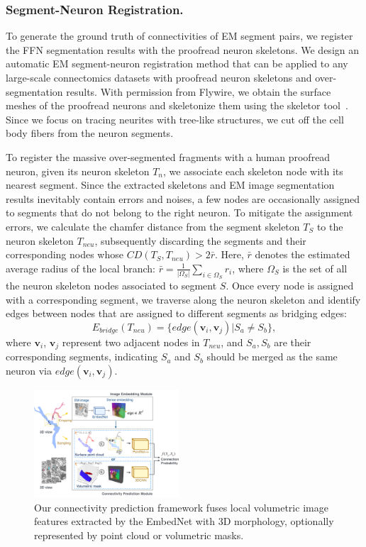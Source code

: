  \subsubsection{Segment-Neuron Registration.} 
 To generate the ground truth of connectivities of EM segment pairs, we register the FFN segmentation results with the proofread neuron skeletons.
 We design an automatic EM segment-neuron registration method that can be applied to any large-scale connectomics datasets with proofread neuron skeletons and over-segmentation results. 
 With permission from Flywire, we obtain the surface meshes of the proofread neurons and skeletonize them using the skeletor tool~\cite{philipp_schlegel_2022_7308283}. 
 Since we focus on tracing neurites with tree-like structures, we cut off the cell body fibers from the neuron segments.

 
To register the massive over-segmented fragments with a human proofread neuron, given its neuron skeleton $T_{n}$, we associate each skeleton node with its nearest segment.
Since the extracted skeletons and EM image segmentation results inevitably contain errors and noises, a few nodes are occasionally assigned to segments that do not belong to the right neuron. 
To mitigate the assignment errors, we calculate the chamfer distance from the segment skeleton $T_{S}$ to the neuron skeleton $T_{neu}$, subsequently discarding the segments and their corresponding nodes whose $CD(T_{S}, T_{neu})>2\bar{r}$. 
Here, $\bar{r}$ denotes the estimated average radius of the local branch: $\bar{r} = \frac{1}{ |\Omega_S|} \sum_{i\in \Omega_S} r_i$, where $\Omega_S$ is the set of all the neuron skeleton nodes associated to segment $S$. 
%
Once every node is assigned with a corresponding segment, we traverse along the neuron skeleton and identify edges between nodes that are assigned to different segments as bridging edges:
\begin{equation}
    E_{bridge}(T_{neu}) = \{edge(\mathbf{v}_i, \mathbf{v}_j)| S_a \neq S_b\},
\end{equation}
where $\mathbf{v}_i$, $\mathbf{v}_j$ represent two adjacent nodes in $T_{neu}$, and $S_a,S_b$ are their corresponding segments, indicating $S_a$ and $S_b$ should be merged as the same neuron via $edge(\mathbf{v}_i,\mathbf{v}_j)$. 
%
\begin{figure}[t]
    \centering
    \includegraphics[width=0.48\textwidth]{figs/3Dmodel.pdf}
    \caption{Our connectivity prediction framework fuses local volumetric image features extracted by the EmbedNet with 3D morphology, optionally represented by point cloud or volumetric masks.}%
    \label{fig:3Dmodel}
\end{figure}

